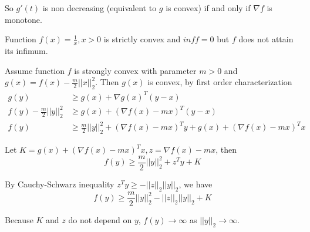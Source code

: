 \documentclass[12pt,letterpaper]{article}
\begin{document}
\begin{alphalist}
    So $g'(t)$ is non decreasing (equivalent to $g$ is convex) if and only if $\nabla f$ is monotone.

\item
    Function $f(x) = \frac{1}{x}, x > 0$ is strictly convex and $inf f = 0$ but
    $f$ does not attain its infimum.

\item
    Assume function $f$ is strongly convex with parameter $m > 0$ and  $g(x) =
    f(x) - \frac{m}{2} ||x||_2^2$. Then $g(x)$ is convex, by first order
    characterization
    \[
        \begin{split}
            g(y) &\ge g(x) + \nabla g(x)^T(y - x) \\
            f(y) - \frac{m}{2}||y||_2^2 &\ge g(x) + (\nabla f(x) - mx)^T(y -
            x)\\
            f(y) &\ge \frac{m}{2}||y||_2^2 + (\nabla f(x) - mx)^Ty + g(x) + (\nabla f(x) - mx)^Tx
        \end{split}
    \]

    Let $K = g(x) + (\nabla f(x) - mx)^Tx, z = \nabla f(x) - mx$, then
    \[
        f(y) \ge \frac{m}{2}||y||_2^2 + z^Ty + K
    \]

    By Cauchy-Schwarz inequality $z^Ty \ge - ||z||_2||y||_2$, we have
    \[
        f(y) \ge \frac{m}{2}||y||_2^2 - ||z||_2 ||y||_2 + K
    \]

    Because $K$ and $z$ do not depend on $y$, $f(y) \to \infty$ as $||y||_2 \to
    \infty$.

\end{alphalist}
\end{document}

